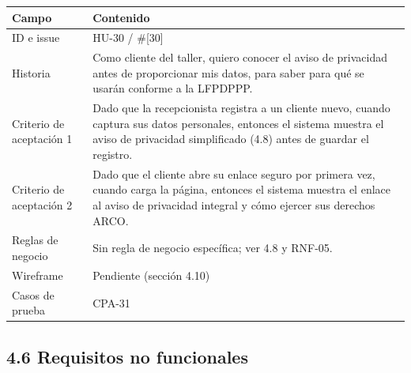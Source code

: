 {\def\LTcaptype{none} %
\begin{longtable}[]{@{}
  >{\raggedright\arraybackslash}p{}
  >{\raggedright\arraybackslash}p{}@{}}
\toprule\noalign{}
\begin{minipage}[b]{\linewidth}\raggedright
\textbf{Campo}
\end{minipage} & \begin{minipage}[b]{\linewidth}\raggedright
\textbf{Contenido}
\end{minipage} \\
\midrule\noalign{}
\endhead
\bottomrule\noalign{}
\endlastfoot
ID e issue & HU-30 / \#{[}30{]} \\
Historia & Como cliente del taller, quiero conocer el aviso de
privacidad antes de proporcionar mis datos, para saber para qué se
usarán conforme a la LFPDPPP. \\
Criterio de aceptación 1 & Dado que la recepcionista registra a un
cliente nuevo, cuando captura sus datos personales, entonces el sistema
muestra el aviso de privacidad simplificado (4.8) antes de guardar el
registro. \\
Criterio de aceptación 2 & Dado que el cliente abre su enlace seguro por
primera vez, cuando carga la página, entonces el sistema muestra el
enlace al aviso de privacidad integral y cómo ejercer sus derechos
ARCO. \\
Reglas de negocio & Sin regla de negocio específica; ver 4.8 y
RNF-05. \\
Wireframe & Pendiente (sección 4.10) \\
Casos de prueba & CPA-31 \\
\end{longtable}
}


\subsection{4.6 Requisitos no
funcionales}\label{requisitos-no-funcionales}

